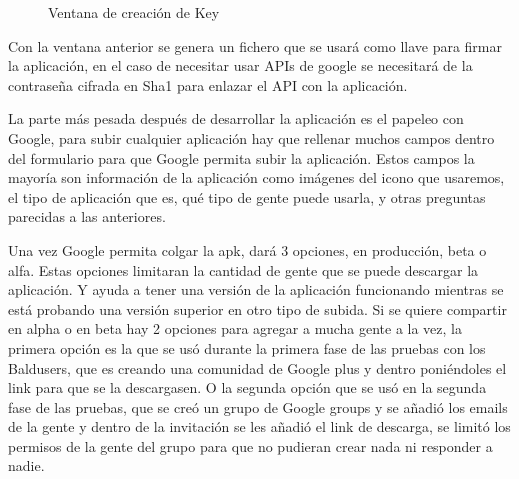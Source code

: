 \newpage
\begin{figure}[H] 
  \begin{center} 
    \caption{Ventana de creación de Key} 
    \label{fig:CreaciónKey} 
  \end{center} 
\end{figure}

Con la ventana anterior se genera un fichero que se usará como llave para firmar la aplicación, en el caso de necesitar usar APIs de google se necesitará de la contraseña cifrada en Sha1 para enlazar el API con la aplicación.


La parte más pesada después de desarrollar la aplicación es el papeleo con Google, para subir cualquier aplicación hay que rellenar muchos campos dentro del formulario para que Google permita subir la aplicación. Estos campos la mayoría son información de la aplicación como imágenes del icono que usaremos, el tipo de aplicación que es, qué tipo de gente puede usarla, y otras preguntas parecidas a las anteriores.

Una vez Google permita colgar la apk, dará 3 opciones,  en producción, beta  o alfa. Estas opciones limitaran la cantidad de gente que se puede descargar la aplicación. Y ayuda a tener una versión de la aplicación funcionando mientras se está probando una versión superior en otro tipo de subida.
Si se quiere compartir en alpha o en beta hay 2 opciones para agregar a mucha gente a la vez, la primera opción es la que se usó durante la primera fase de las pruebas con los Baldusers, que es creando una comunidad de Google plus y dentro poniéndoles el link para que se la descargasen. O la segunda opción que se usó en la segunda fase de las pruebas, que se creó un grupo de Google groups y se añadió los emails de la gente y dentro de la invitación se les añadió el link de descarga, se limitó los permisos de la gente del grupo para que no pudieran crear nada ni responder a nadie.

